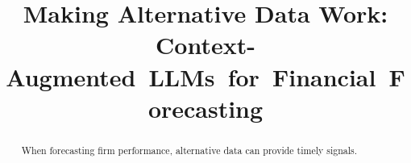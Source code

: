 \documentclass{article}
\title{Making Alternative Data Work: \mbox{Context-Augmented LLMs for Financial Forecasting}}
\begin{document}
\begin{abstract}
When forecasting firm performance, alternative data can provide timely signals.
\end{abstract}

\end{document}
